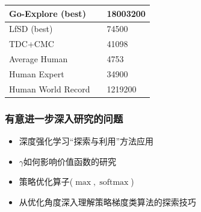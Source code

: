 \documentclass{beamer}
\begin{document}
\begin{CJK*}{GBK}{hei}
\begin{frame}
{\begin{minipage}{\linewidth}
\begin{table}[]
\begin{tabular}{|l|l|l|}
Go-Explore (best)                                                       &  \citep{Ecoffet2019GoExploreAN}  & 18003200            \\ \hline
LfSD (best)                                                             &  \citep{Salimans2018LearningMR}  & 74500               \\ \hline
TDC+CMC                                                                 &  \citep{Aytar2018PlayingHE}  & 41098               \\ \hline
Average Human                                                           &  \citep{Pohlen2018ObserveAL}  & 4753                \\ \hline
Human Expert                                                            &  \citep{Pohlen2018ObserveAL}  & 34900               \\ \hline
Human World Record                                                      &  \citep{atariscore}  & 1219200             \\ \hline
\end{tabular}
\end{table}
        \end{minipage}
}
\end{frame}

\begin{frame}\frametitle{有意进一步深入研究的问题}
\begin{itemize}
\item 深度强化学习“探索与利用”方法应用
\item $\gamma$如何影响价值函数的研究
\item 策略优化算子($\operatorname{\max}, \operatorname{softmax}$)
\item 从优化角度深入理解策略梯度类算法的探索技巧
\end{itemize}
\end{frame}

\end{CJK*}
\newpage
\tiny


\end{document}

